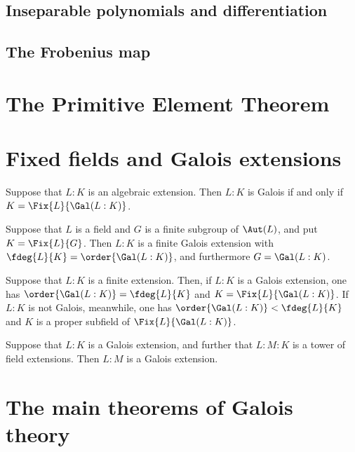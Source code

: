 \documentclass[a4paper]{article}
\begin{document}
\subsection{Inseparable polynomials and differentiation}

\subsection{The Frobenius map}





\section{The Primitive Element Theorem}

\section{Fixed fields and Galois extensions}

\begin{ttheorem}
  Suppose that \( L:K \) is an algebraic extension.
  Then \( L:K \) is Galois if and only if \( K=\Fix{L}{\Gal(L:K)} \).
\end{ttheorem}

\begin{ttheorem}
  Suppose that \( L \) is a field and \( G \) is a finite subgroup of \( \Aut(L) \), and put \( K=\Fix{L}{G} \).
  Then \( L:K \) is a finite Galois extension with \( \fdeg{L}{K}=\order{\Gal(L:K)} \), and furthermore \( G=\Gal(L:K) \).
\end{ttheorem}

\begin{ttheorem}
  Suppose that \( L:K \) is a finite extension.
  Then, if \( L:K \) is a Galois extension, one has \( \order{\Gal(L:K)}=\fdeg{L}{K} \) and \( K=\Fix{L}{\Gal(L:K)} \).
  If \( L:K \) is not Galois, meanwhile, one has \( \order{\Gal(L:K)}<\fdeg{L}{K} \) and \( K \) is a proper subfield of \( \Fix{L}{\Gal(L:K)} \).
\end{ttheorem}

\begin{tproposition}
  Suppose that \( L:K \) is a Galois extension, and further that \( L:M:K \) is a tower of field extensions.
  Then \( L:M \) is a Galois extension.
\end{tproposition}

\section{The main theorems of Galois theory}
\end{document}
